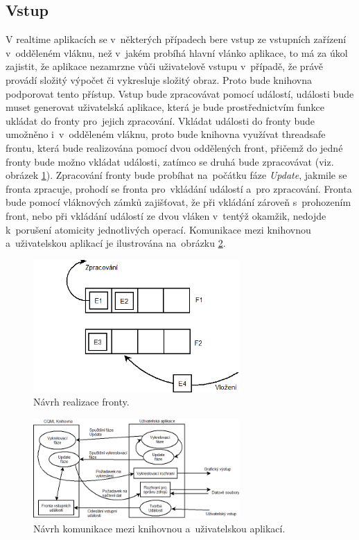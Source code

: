 \documentclass[11pt,twoside,a4paper]{book}
\begin{document}
\subsection {Vstup}
V realtime aplikacích se v~některých případech bere vstup ze vstupních zařízení v~odděleném vláknu, než v~jakém probíhá hlavní vlánko aplikace, to má za úkol zajistit, že aplikace nezamrzne vůči uživatelově vstupu v~případě, že právě provádí složitý výpočet či vykresluje složitý obraz. Proto bude knihovna podporovat tento přístup. Vstup bude zpracovávat pomocí událostí, události bude muset generovat uživatelská aplikace, která je bude prostřednictvím funkce ukládat do fronty pro~jejich zpracování. Vkládat události do fronty bude umožněno i~v~odděleném vláknu, proto bude knihovna využívat threadsafe frontu, která bude realizována pomocí dvou oddělených front, přičemž do jedné fronty bude možno vkládat události, zatímco se druhá bude zpracovávat (viz. obrázek \ref{fig:que1N}). Zpracování fronty bude probíhat na~počátku fáze \textit{Update}, jakmile se fronta zpracuje, prohodí se fronta pro~vkládání událostí a~pro zpracování. Fronta bude pomocí vláknových zámků zajišťovat, že při vkládání zároveň s~prohozením front, nebo při vkládání událostí ze dvou vláken v~tentýž okamžik, nedojde k~porušení atomicity jednotlivých operací. Komunikace mezi knihovnou a~uživatelskou aplikací je ilustrována na~obrázku \ref{fig:lib1N}.\\
\begin{figure}[!ht]
\begin{center}
  \includegraphics[width=0.7\textwidth]{Diagram5}
\caption{{\label{fig:que1N}}Návrh realizace fronty.}
\end{center}
\end{figure}
\begin{figure}[!ht]
\begin{center}
  \includegraphics[width=0.7\textwidth]{Diagram4}
\caption{{\label{fig:lib1N}}Návrh komunikace mezi knihovnou a~uživatelskou aplikací.}
\end{center}
\end{figure}
\end{document}
